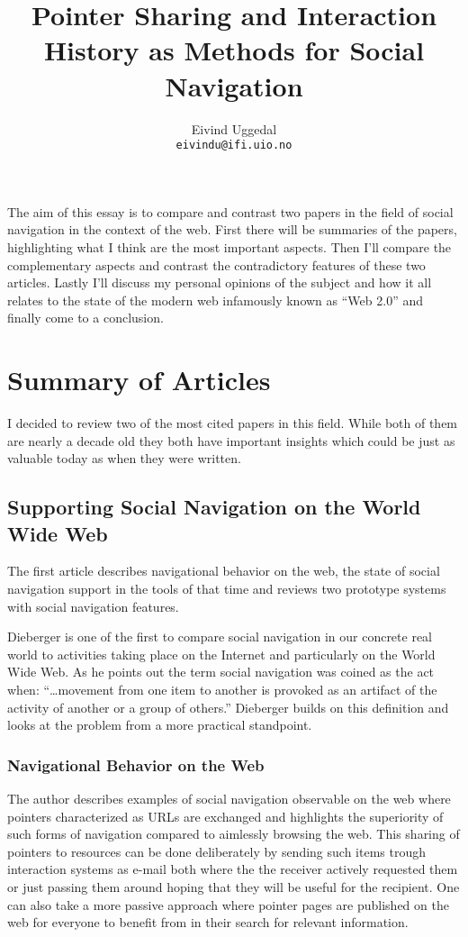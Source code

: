\documentclass[12pt,a4paper]{article}
\title{Pointer Sharing and Interaction History
       as Methods for Social Navigation}
\author{Eivind Uggedal\\
        \texttt{eivindu@ifi.uio.no}}
\date{}
\begin{document}
\maketitle{}

The aim of this essay is to compare and contrast two papers in the field of
social navigation in the context of the web. First there will be summaries
of the papers, highlighting what I think are the most important aspects.
Then I'll compare the complementary aspects and contrast the contradictory
features of these two articles. Lastly I'll discuss my personal
opinions of the subject and how it all relates to the state of the modern web
infamously known as ``Web 2.0'' and finally come to a conclusion.

\section{Summary of Articles}

I decided to review two of the most cited papers in this field. While both of
them are nearly a decade old they both have important insights which could be
just as valuable today as when they were written.

\subsection{Supporting Social Navigation on the World Wide Web}
The first article \cite{dieberger97} describes navigational behavior on the
web, the state of social navigation support in the tools of that time and
reviews two prototype systems with social navigation features.

Dieberger is one of the first to compare social navigation in our concrete
real world to activities taking place on the Internet and particularly on the
World Wide Web. As he points out the term social navigation was coined as the
act when:
``\ldots movement from one item to another is provoked as an artifact of the
activity of another or a group of others.'' \cite{dourish94} Dieberger builds
on this definition and looks at the problem from a more practical standpoint.

\subsubsection{Navigational Behavior on the Web}

The author describes examples of social navigation observable on the web where
pointers characterized as URLs are exchanged and highlights the superiority of
such forms of navigation compared to aimlessly browsing the web. This sharing
of pointers to resources can be done deliberately by sending such
items trough interaction systems as e-mail both where the the receiver
actively requested them or just passing them around hoping that they
will be useful for the recipient. One can also take a more passive approach
where pointer pages are published on the web for everyone to benefit from in
their search for relevant information.
\end{document}
